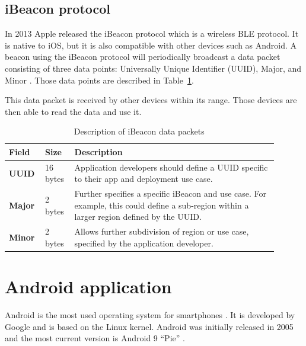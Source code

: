 \documentclass[../Main/thesis.tex]{subfiles}
\begin{document}
\subsection{iBeacon protocol}
In 2013 Apple released the iBeacon protocol which is a wireless BLE protocol.
It is native to iOS, but it is also compatible with other devices such as Android.
A beacon using the iBeacon protocol will periodically broadcast a data packet consisting of three data points: Universally Unique Identifier (UUID), Major, and Minor \citep{Apple2014}.
Those data points are described in Table~\ref{tab:iBeacon-protocol}.

This data packet is received by other devices within its range. 
Those devices are then able to read the data and use it.

\begin{table}[h]
\centering
\caption[Description of iBeacon data packets]{Description of iBeacon data packets\citep[p. 3]{Apple2014}}
\begin{tabular}{|p{0.1\linewidth}|p{0.1\linewidth}|p{0.7\linewidth}|}
\hline
\textbf{Field} & \textbf{Size} & \textbf{Description}                                                                                                                       \\ \hline
\textbf{UUID}  & 16 bytes      & Application developers should define a UUID specific to their app and deployment use case.                                                 \\ \hline
\textbf{Major} & 2 bytes       & Further specifies a specific iBeacon and use case. For example, this could define a sub-region within a larger region defined by the UUID. \\ \hline
\textbf{Minor} & 2 bytes       & Allows further subdivision of region or use case, specified by the application developer.                                                  \\ \hline
\end{tabular}
\label{tab:iBeacon-protocol}
\end{table}

\section{Android application}
Android is the most used operating system for smartphones \citep{osmarketshare}. 
It is developed by Google and is based on the Linux kernel.
Android was initially released in 2005 \citep{Morrill2008a} and the most current version is Android 9 ``Pie'' \citep{Samat2018}.
\end{document}
